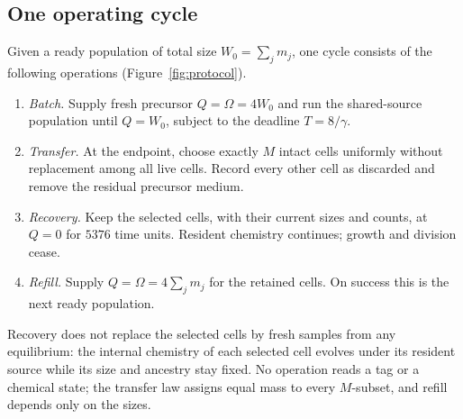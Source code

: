 \documentclass[11pt,a4paper]{article}
\theoremstyle{plain}
\theoremstyle{definition}
\theoremstyle{remark}
\begin{document}
\subsection{One operating cycle}\label{sec:cycle}
Given a ready population of total size $W_0=\sum_jm_j$, one cycle consists of the following operations (Figure~\ref{fig:protocol}).
\begin{enumerate}
\item \emph{Batch.} Supply fresh precursor $Q=\Omega=4W_0$ and run the shared-source population until $Q=W_0$, subject to the deadline $T=8/\gamma$.
\item \emph{Transfer.} At the endpoint, choose exactly $M$ intact cells uniformly without replacement among all live cells. Record every other cell as discarded and remove the residual precursor medium.
\item \emph{Recovery.} Keep the selected cells, with their current sizes and counts, at $Q=0$ for $5376$ time units. Resident chemistry continues; growth and division cease.
\item \emph{Refill.} Supply $Q=\Omega=4\sum_jm_j$ for the retained cells. On success this is the next ready population.
\end{enumerate}
Recovery does not replace the selected cells by fresh samples from any equilibrium: the internal chemistry of each selected cell evolves under its resident source while its size and ancestry stay fixed. No operation reads a tag or a chemical state; the transfer law assigns equal mass to every $M$-subset, and refill depends only on the sizes.
\end{document}
